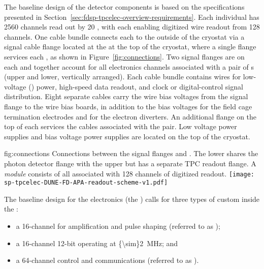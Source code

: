 The baseline design of the  detector components is
based on the specifications %
presented in Section~\ref{sec:fdsp-tpcelec-overview-requirements}. 
Each individual  has \num{2560} channels read out by \num{20} 
, with each  enabling digitized wire readout 
from \num{128} channels. One cable bundle connects each  to
the outside of the cryostat via a  signal cable flange located 
at the  \fdth at the top of the cryostat, where a single flange 
services each , as shown in Figure~\ref{fig:connections}. 
Two  signal flanges are on each \fdth and together account for 
all electronics channels associated with a pair of s (upper 
and lower, vertically arranged). Each cable bundle contains wires for 
low-voltage () power, high-speed data readout, and clock or 
digital-control signal distribution. Eight separate cables carry the 
 wire bias voltages from the signal flange to the  
wire bias boards, in addition to the bias voltages for the field cage 
termination electrodes and for the electron diverters. An additional 
flange on the top of each \fdth services the  cables associated 
with the  pair. Low voltage power supplies and bias voltage
power supplies are located on the top of the cryostat. 

\begin{dunefigure}
{fig:connections}
{Connections between the signal flanges and . The lower 
 shares the photon detector flange with the 
upper  but has a separate TPC readout flange. 
A \textit{ module} consists of all  
associated with \num{128} channels of digitized readout.}
\texttt{[image: sp-tpcelec-DUNE-FD-APA-readout-scheme-v1.pdf]}
\end{dunefigure}

The baseline design for the   electronics (the ) calls for three 
types of custom  inside  the :
\begin{itemize}
\item{a \num{16}-channel   for amplification 
and pulse shaping (referred to as );}
\item{a \num{16}-channel \num{12}-bit   
operating at \SI{{\sim}2}{MHz}; and}
\item{a \num{64}-channel control and communications  
(referred to as ).}
\end{itemize}

